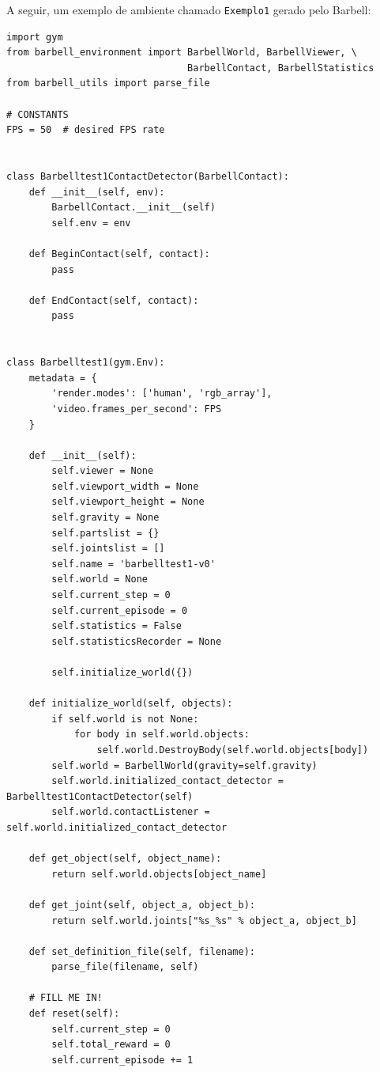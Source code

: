 \documentclass[cic,tc]{iiufrgs}
\newenvironment{longlisting}{\captionsetup{type=listing}}{}
\begin{document}
A seguir, um exemplo de ambiente chamado \texttt{Exemplo1} gerado pelo Barbell:
\begin{longlisting}
\begin{verbatim}
import gym
from barbell_environment import BarbellWorld, BarbellViewer, \
                                BarbellContact, BarbellStatistics
from barbell_utils import parse_file

# CONSTANTS
FPS = 50  # desired FPS rate


class Barbelltest1ContactDetector(BarbellContact):
    def __init__(self, env):
        BarbellContact.__init__(self)
        self.env = env

    def BeginContact(self, contact):
        pass

    def EndContact(self, contact):
        pass


class Barbelltest1(gym.Env):
    metadata = {
        'render.modes': ['human', 'rgb_array'],
        'video.frames_per_second': FPS
    }

    def __init__(self):
        self.viewer = None
        self.viewport_width = None
        self.viewport_height = None
        self.gravity = None
        self.partslist = {}
        self.jointslist = []
        self.name = 'barbelltest1-v0'
        self.world = None
        self.current_step = 0
        self.current_episode = 0
        self.statistics = False
        self.statisticsRecorder = None

        self.initialize_world({})

    def initialize_world(self, objects):
        if self.world is not None:
            for body in self.world.objects:
                self.world.DestroyBody(self.world.objects[body])
        self.world = BarbellWorld(gravity=self.gravity)
        self.world.initialized_contact_detector = Barbelltest1ContactDetector(self)
        self.world.contactListener = self.world.initialized_contact_detector

    def get_object(self, object_name):
        return self.world.objects[object_name]

    def get_joint(self, object_a, object_b):
        return self.world.joints["%s_%s" % object_a, object_b]

    def set_definition_file(self, filename):
        parse_file(filename, self)

    # FILL ME IN!
    def reset(self):
        self.current_step = 0
        self.total_reward = 0
        self.current_episode += 1


\end{verbatim}
\end{longlisting}
\end{document}
